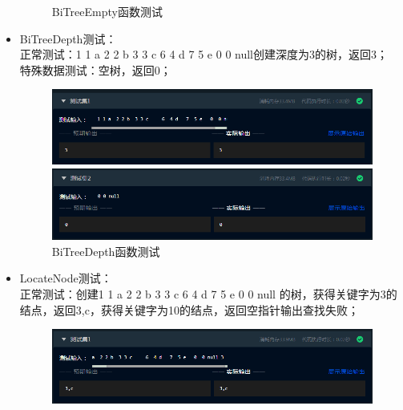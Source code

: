 \documentclass[supercite]{Experimental_Report}
\theoremstyle{definition}
\begin{document}
\begin{itemize}
\begin{figure}[htbp]
\begin{minipage}{0.9\linewidth}
		      \end{minipage}
		      \caption{BiTreeEmpty函数测试}
		      \label{fig2-6}
	      \end{figure}
	\item BiTreeDepth测试：\\正常测试：1 1 a  2 2 b  3 3 c     6  4 d   7  5 e   0  0 null创建深度为3的树，返回3；\\
	      特殊数据测试：空树，返回0；
	      \newpage
	      \begin{figure}[htbp]
		      \centering
		      \begin{minipage}{0.9\linewidth}
			      \centering
			      \includegraphics[width=0.9\linewidth]{images/test-63.png}
		      \end{minipage}
		      \begin{minipage}{0.9\linewidth}
			      \centering
			      \includegraphics[width=0.9\linewidth]{images/test-64.png}
		      \end{minipage}
		      \caption{BiTreeDepth函数测试}
		      \label{fig2-7}
	      \end{figure}
	\item LocateNode测试：\\正常测试：创建1 1 a 2 2 b 3 3 c 6 4 d 7 5 e 0 0 null 的树，获得关键字为3的结点，返回3,c，获得关键字为10的结点，返回空指针输出查找失败；
	      \begin{figure}[htbp]
		      \centering
		      \begin{minipage}{0.9\linewidth}
			      \centering
			      \includegraphics[width=0.9\linewidth]{images/test-65.png}
		      \end{minipage}

\end{figure}
\end{itemize}
\end{document}
